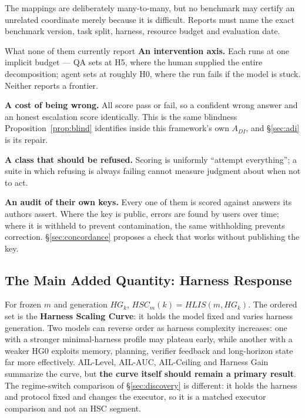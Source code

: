 \documentclass[11pt]{article}
\theoremstyle{definition}
\begin{document}
The mappings are deliberately many-to-many, but no benchmark may certify an unrelated coordinate merely because it is difficult. Reports must name the exact benchmark version, task split, harness, resource budget and evaluation date.

\begin{claimbox}{What none of them currently report}
\textbf{An intervention axis.} Each runs at one implicit budget --- QA sets at H5, where the human supplied the entire decomposition; agent sets at roughly H0, where the run fails if the model is stuck. Neither reports a frontier.

\textbf{A cost of being wrong.} All score pass or fail, so a confident wrong answer and an honest escalation score identically. This is the same blindness Proposition~\ref{prop:blind} identifies inside this framework's own $A_{DI}$, and \S\ref{sec:adi} is its repair.

\textbf{A class that should be refused.} Scoring is uniformly ``attempt everything''; a suite in which refusing is always failing cannot measure judgment about when not to act.

\textbf{An audit of their own keys.} Every one of them is scored against answers its authors assert. Where the key is public, errors are found by users over time; where it is withheld to prevent contamination, the same withholding prevents correction. \S\ref{sec:concordance} proposes a check that works without publishing the key.
\end{claimbox}

\subsection{The Main Added Quantity: Harness Response}

For frozen $m$ and generation $HG_k$, $HSC_m(k) = HLIS(m,HG_k)$. The ordered set is the \textbf{Harness Scaling Curve}: it holds the model fixed and varies harness generation. Two models can reverse order as harness complexity increases: one with a stronger minimal-harness profile may plateau early, while another with a weaker HG0 exploits memory, planning, verifier feedback and long-horizon state far more effectively. AIL-Level, AIL-AUC, AIL-Ceiling and Harness Gain summarize the curve, but \textbf{the curve itself should remain a primary result}. The regime-switch comparison of \S\ref{sec:discovery} is different: it holds the harness and protocol fixed and changes the executor, so it is a matched executor comparison and not an HSC segment.
\end{document}
